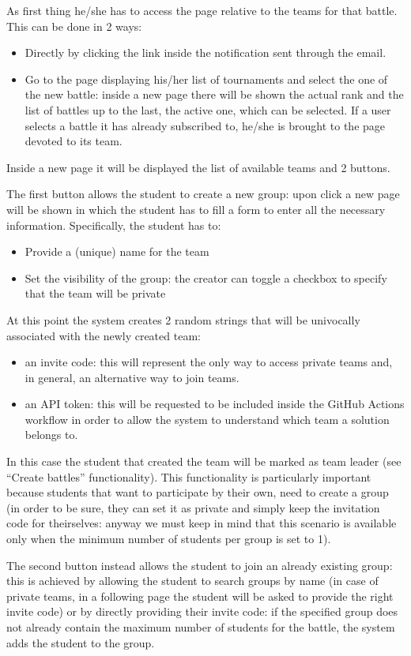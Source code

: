 As first thing he/she has to access the page relative to the teams for that battle. This can be done in 2 ways:
\begin{itemize}
    \item Directly by clicking the link inside the notification sent through the email.
    \item Go to the page displaying his/her list of tournaments and select the one of the new battle: inside a new page there will be shown the actual rank and the list of battles up to the last,  the active one, which can be selected. If a user selects a battle it has already subscribed to, he/she is brought to the page devoted to its team.
\end{itemize}
Inside a new page it will be displayed the list of available teams and 2 buttons.

The first button allows the student to create a new group: upon click a new page will be shown in which the student has to fill a form to enter all the necessary information. Specifically, the student has to:
\begin{itemize}
    \item Provide a (unique) name for the team
    \item Set the visibility of the group: the creator can toggle a checkbox to specify that the team will be private
\end{itemize}
At this point the system creates 2 random strings that will be univocally associated with the newly created team:
\begin{itemize}
    \item an invite code: this will represent the only way to access private teams and, in general, an alternative way to join teams.
    \item an API token: this will be requested to be included inside the GitHub Actions workflow in order to allow the system to understand which team a solution belongs to.
\end{itemize}  
In this case the student that created the team will be marked as team leader (see “Create battles” functionality). This functionality is particularly important because students that want to participate by their own, need to create a group (in order to be sure, they can set it as private and simply keep the invitation code for theirselves: anyway we must keep in mind that this scenario is available only when the minimum number of students per group is set to 1).

The second button instead allows the student to join an already existing group: this is achieved by allowing the student to search groups by name (in case of private teams, in a following page the student will be asked to provide the right invite code) or by directly providing their invite code: if the specified group does not already contain the maximum number of students for the battle, the system adds the student to the group.
